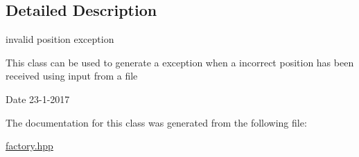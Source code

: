\subsection{Detailed Description}
invalid position exception 

This class can be used to generate a exception when a incorrect position has been received using input from a file

\begin{DoxyDate}{Date}
23-\/1-\/2017 
\end{DoxyDate}


The documentation for this class was generated from the following file\+:\begin{DoxyCompactItemize}
\item 
\hyperlink{factory_8hpp}{factory.\+hpp}\end{DoxyCompactItemize}
